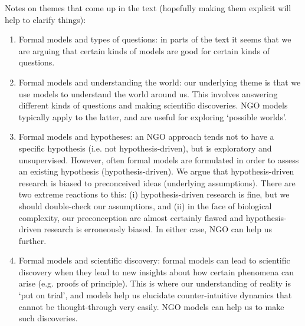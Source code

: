 Notes on themes that come up in the text (hopefully making them explicit will help to clarify things):
\begin{enumerate}
\item Formal models and types of questions: in parts of the text it seems that we are arguing that certain kinds of models are good for certain kinds of questions.
\item Formal models and understanding the world: our underlying theme is that we use models to understand the world around us. This involves answering different kinds of questions and making scientific discoveries. NGO models typically apply to the latter, and are useful for exploring `possible worlds'.
\item Formal models and hypotheses: an NGO approach tends not to have a specific hypothesis (i.e. not hypothesis-driven), but is exploratory and unsupervised. However, often formal models are formulated in order to assess an existing hypothesis (hypothesis-driven). We argue that hypothesis-driven research is biased to preconceived ideas (underlying assumptions). There are two extreme reactions to this: (i) hypothesis-driven research is fine, but we should double-check our assumptions, and (ii) in the face of biological complexity, our preconception are almost certainly flawed and hypothesis-driven research is erroneously biased. In either case, NGO can help us further.
\item Formal models and scientific discovery: formal models can lead to scientific discovery when they lead to new insights about how certain phenomena can arise (e.g. proofs of principle). This is where our understanding of reality is `put on trial', and models help us elucidate counter-intuitive dynamics that cannot be thought-through very easily. NGO models can help us to make such discoveries.
\end{enumerate}
  